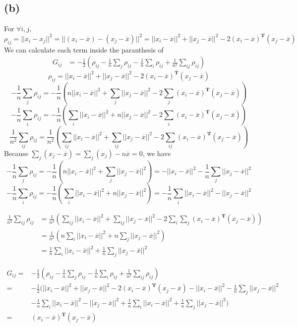 \documentclass[twoside,11pt]{homework}
\begin{document}
\subsection*{(b)}
For $\forall i,j$, $\rho_{ij} = ||x_i-x_j||^2 = ||(x_i-\overline{x}) - (x_j - \overline{x})||^2 = ||x_i - \overline{x}||^2 + ||x_j - \overline{x}||^2 - 2(x_i-\overline{x})^\mathbf{T}(x_j - \overline{x})$
We can calculate each term inside the paranthesis of
\begin{align*}
    G_{ij} &= -\frac{1}{2}(\rho_{ij} - \frac{1}{n}\sum_{j}\rho_{ij} - \frac{1}{n}\sum_{i}\rho_{ij} + \frac{1}{n^2}\sum_{ij}\rho_{ij})
\end{align*}
$$\rho_{ij} = ||x_i - \overline{x}||^2 + ||x_j - \overline{x}||^2 - 2(x_i-\overline{x})^\mathbf{T}(x_j - \overline{x})$$
$$-\frac{1}{n}\sum_j \rho_{ij} = 
-\frac{1}{n}(n||x_i - \overline{x}||^2 + \sum_j ||x_j - \overline{x}||^2 - 2 \sum_j (x_i - \overline{x})^\mathbf{T}(x_j - \overline{x}))$$
$$-\frac{1}{n}\sum_i \rho_{ij} = 
-\frac{1}{n}(\sum_i ||x_i - \overline{x}||^2 + n||x_j - \overline{x}||^2 - 2 \sum_i (x_i - \overline{x})^\mathbf{T}(x_j - \overline{x}))$$
$$\frac{1}{n^2}\sum_{ij} \rho_{ij} = \frac{1}{n^2}(\sum_{ij}||x_i - \overline{x}||^2 + \sum_{ij}||x_j - \overline{x}||^2 - 2\sum_{ij}(x_i - \overline{x})^\mathbf{T}(x_j - \overline{x}))$$
Because $\sum_j(x_j - \overline{x}) = \sum_j(x_j) - n\overline{x} = 0$, we have
$$-\frac{1}{n}\sum_j \rho_{ij} = 
-\frac{1}{n}(n||x_i - \overline{x}||^2 + \sum_j ||x_j - \overline{x}||^2) = -||x_i - \overline{x}||^2 - \frac{1}{n}\sum_j ||x_j - \overline{x}||^2$$
$$-\frac{1}{n}\sum_i \rho_{ij} = 
-\frac{1}{n}(\sum_i ||x_i - \overline{x}||^2 + n||x_j - \overline{x}||^2) = -\frac{1}{n}\sum_i ||x_i - \overline{x}||^2 - ||x_j - \overline{x}||^2$$

\begin{align*}
    \frac{1}{n^2}\sum_{ij} \rho_{ij} &= \frac{1}{n^2}(\sum_{ij}||x_i - \overline{x}||^2 + \sum_{ij}||x_j - \overline{x}||^2 - 2\sum_i \sum_j(x_i - \overline{x})^\mathbf{T}(x_j - \overline{x}))\\
    &= \frac{1}{n^2} (n\sum_{i}||x_i - \overline{x}||^2 + n\sum_{j}||x_j - \overline{x}||^2)\\
    &= \frac{1}{n}\sum_{i}||x_i - \overline{x}||^2 + \frac{1}{n}\sum_{j}||x_j - \overline{x}||^2
\end{align*}

\begin{align*}
     G_{ij} =& -\frac{1}{2}(\rho_{ij} - \frac{1}{n}\sum_{j}\rho_{ij} - \frac{1}{n}\sum_{i}\rho_{ij} + \frac{1}{n^2}\sum_{ij}\rho_{ij})\\
     =& -\frac{1}{2}(||x_i - \overline{x}||^2 + ||x_j - \overline{x}||^2 - 2(x_i-\overline{x})^\mathbf{T}(x_j - \overline{x}) 
     -||x_i - \overline{x}||^2 - \frac{1}{n}\sum_j ||x_j - \overline{x}||^2\\
     &-\frac{1}{n}\sum_i ||x_i - \overline{x}||^2 - ||x_j - \overline{x}||^2
     + \frac{1}{n}\sum_{i}||x_i - \overline{x}||^2 + \frac{1}{n}\sum_{j}||x_j - \overline{x}||^2
     )\\
     =& (x_i - \overline{x})^\textbf{T}(x_j -\overline{x})
\end{align*}
\end{document}
